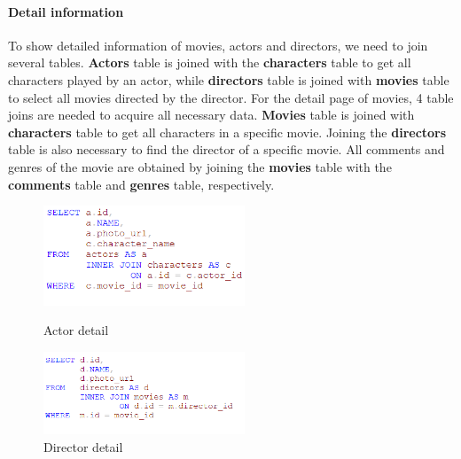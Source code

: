 \begin{CJK*}{UTF8}{gbsn}
\paragraph{Detail information} To show detailed information of movies, actors and directors, we need to join several tables. \textbf{Actors} table is joined with the \textbf{characters} table to get all characters played by an actor, while \textbf{directors} table is joined with \textbf{movies} table to select all movies directed by the director. For the detail page of movies, 4 table joins are needed to acquire all necessary data. \textbf{Movies} table is joined with \textbf{characters} table to get all characters in a specific movie. Joining the \textbf{directors} table is also necessary to find the director of a specific movie. All comments and genres of the movie are obtained by joining the \textbf{movies} table with the \textbf{comments} table and \textbf{genres} table, respectively.

\begin{figure}[htbp]
\centering
\begin{minipage}[t]{0.45\textwidth}
\centering
\includegraphics[width=6cm]{a_detail.png}
\caption{Actor detail}
\end{minipage}
\begin{minipage}[t]{0.45\textwidth}
\centering
\includegraphics[width=6cm]{d_detail.png}
\caption{Director detail}
\end{minipage}
\end{figure}


\end{CJK*}

